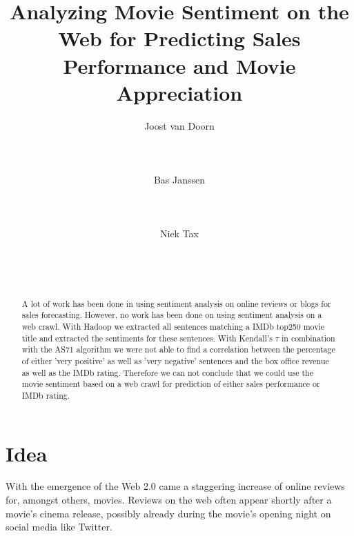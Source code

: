 \documentclass{sig-alternate-br}
\begin{document}

\title{Analyzing Movie Sentiment on the Web for Predicting Sales Performance and Movie Appreciation}

\author{
\alignauthor Joost van Doorn\\
       \\
       \\
       \\
\alignauthor Bas Janssen\\
       \\
       \\
       \\
\alignauthor Niek Tax\\
       \\
       \\
       \\
}

\maketitle
\begin{abstract}
A lot of work has been done in using sentiment analysis on online reviews or blogs for sales forecasting. However, no work has been done on using sentiment analysis on a web crawl. With Hadoop we extracted all sentences matching a IMDb top250 movie title and extracted the sentiments for these sentences. With Kendall's $\tau$ in combination with the AS71 algorithm we were not able to find a correlation between the percentage of either 'very positive' as well as 'very negative' sentences and the box office revenue as well as the IMDb rating. Therefore we can not conclude that we could use the movie sentiment based on a web crawl for prediction of either sales performance or IMDb rating.
\end{abstract} 


\section{Idea}
With the emergence of the Web 2.0 came a staggering increase of online reviews for, amongst others, movies. Reviews on the web often appear shortly after a movie's cinema release, possibly already during the movie's opening night on social media like Twitter. 
\end{document}
